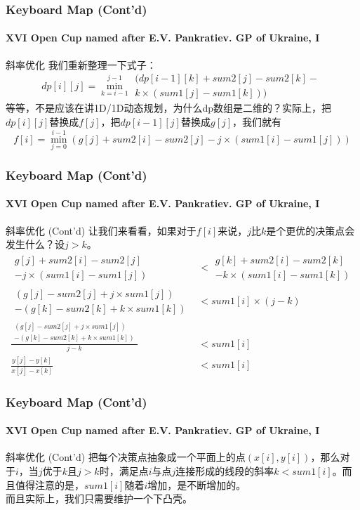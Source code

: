 \documentclass[hyperref={unicode=true}]{beamer}
\theoremstyle{definition}
\theoremstyle{proof}
\begin{document}
\begin{frame}\frametitle{Keyboard Map (Cont'd)}
  \framesubtitle{XVI Open Cup named after E.V. Pankratiev. GP of Ukraine, I}
  \begin{exampleblock}{斜率优化}
    我们重新整理一下式子：
    \[dp[i][j] = \min_{k=i-1}^{j-1}{\substack{(dp[i-1][k] + sum2[j] - sum2[k] - \\k \times (sum1[j] - sum1[k]))}}\]
    等等，不是应该在讲1D/1D动态规划，为什么dp数组是二维的？实际上，把$dp[i][j]$替换成$f[j]$，把$dp[i-1][j]$替换成$g[j]$，我们就有
    \[f[i] = \min_{j=0}^{i-1}{(g[j] + sum2[i] - sum2[j] - j \times (sum1[i] - sum1[j]))}\]
  \end{exampleblock}
\end{frame}
\begin{frame}\frametitle{Keyboard Map (Cont'd)}
  \framesubtitle{XVI Open Cup named after E.V. Pankratiev. GP of Ukraine, I}
  \begin{exampleblock}{斜率优化 (Cont'd)}
    让我们来看看，如果对于$f[i]$来说，$j$比$k$是个更优的决策点会发生什么？设$j>k$。
    \begin{align}
      \substack{g[j] + sum2[i] - sum2[j] \\- j \times (sum1[i] - sum1[j])} &< \substack{g[k] + sum2[i] - sum2[k] \\-k \times (sum1[i] - sum1[k])}\\
      \substack{(g[j] - sum2[j] + j \times sum1[j]) \\-(g[k] - sum2[k] + k \times sum1[k])} &< sum1[i] \times (j - k)\\
      \frac{\substack{(g[j] - sum2[j] + j \times sum1[j]) \\-(g[k] - sum2[k] + k \times sum1[k])}}{j-k} &< sum1[i]\\
      \frac{y[j]-y[k]}{x[j]-x[k]} &< sum1[i]
    \end{align}
  \end{exampleblock}
\end{frame}
\begin{frame}[fragile]\frametitle{Keyboard Map (Cont'd)}
  \framesubtitle{XVI Open Cup named after E.V. Pankratiev. GP of Ukraine, I}
  \begin{exampleblock}{斜率优化 (Cont'd)}
    把每个决策点抽象成一个平面上的点$(x[i],y[i])$，那么对于$i$，当$j$优于$k$且$j>k$时，满足点$i$与点$j$连接形成的线段的斜率$k < sum1[i]$。而且值得注意的是，$sum1[i]$随着$i$增加，是不断增加的。\\
    而且实际上，我们只需要维护一个下凸壳。
  \end{exampleblock}
\end{frame}
\end{document}

